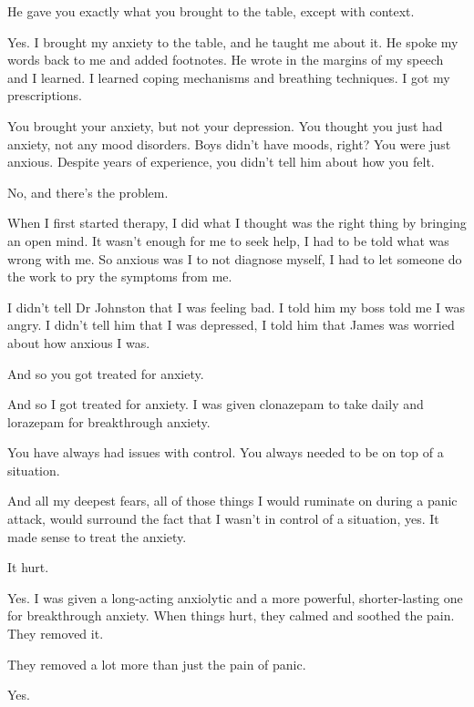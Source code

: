 \begin{ally}
He gave you exactly what you brought to the table, except with context.
\end{ally}
Yes. I brought my anxiety to the table, and he taught me about it. He spoke my words back to me and added footnotes. He wrote in the margins of my speech and I learned. I learned coping mechanisms and breathing techniques. I got my prescriptions.

\begin{ally}
You brought your anxiety, but not your depression. You thought you just had anxiety, not any mood disorders. Boys didn't have moods, right? You were just anxious. Despite years of experience, you didn't tell him about how you felt.
\end{ally}
No, and there's the problem.
\newpage

\noindent When I first started therapy, I did what I thought was the right thing by bringing an open mind. It wasn't enough for me to seek help, I had to be told what was wrong with me. So anxious was I to not diagnose myself, I had to let someone do the work to pry the symptoms from me.

I didn't tell Dr Johnston that I was feeling bad. I told him my boss told me I was angry. I didn't tell him that I was depressed, I told him that James was worried about how anxious I was.

\begin{ally}
And so you got treated for anxiety.
\end{ally}
And so I got treated for anxiety. I was given clonazepam to take daily and lorazepam for breakthrough anxiety.

\begin{ally}
You have always had issues with control. You always needed to be on top of a situation.
\end{ally}
And all my deepest fears, all of those things I would ruminate on during a panic attack, would surround the fact that I wasn't in control of a situation, yes. It made sense to treat the anxiety.

\begin{ally}
It hurt.
\end{ally}
Yes. I was given a long-acting anxiolytic and a more powerful, shorter-lasting one for breakthrough anxiety. When things hurt, they calmed and soothed the pain. They removed it.

\begin{ally}
They removed a lot more than just the pain of panic.
\end{ally}
Yes.
\newpage


